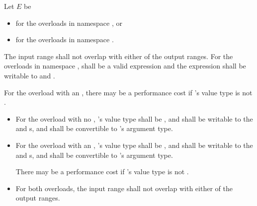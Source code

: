 \begin{itemdescr}
\begin{addedblock}
\pnum
Let $E$ be
\begin{itemize}
\item {} for the overloads in namespace , or
\item {} for the overloads in
  namespace .
\end{itemize}

\pnum
\requires
The input range shall not overlap with either of the output ranges.
For the overloads in namespace ,
 shall be a valid expression and
the expression  shall be
writable to
 and .
\begin{note}
For the overload with an ,
there may be a performance cost if 's value type is not
.
\end{note}
\end{addedblock}

\begin{removedblock}
\begin{itemize}
\item
For the overload with no , 's
value type shall be ,
and shall be writable to the 
and  s, and shall be convertible to
's argument type.

\item
For the overload with an , 's
value type shall be , and shall be writable to the
 and  s, and shall be
convertible to 's argument type.
\begin{note}
There may be a performance cost if 's value type is not
.
\end{note}

\item
For both overloads, the input range shall not overlap with either of the output ranges.
\end{itemize}
\end{removedblock}


\end{itemdescr}
